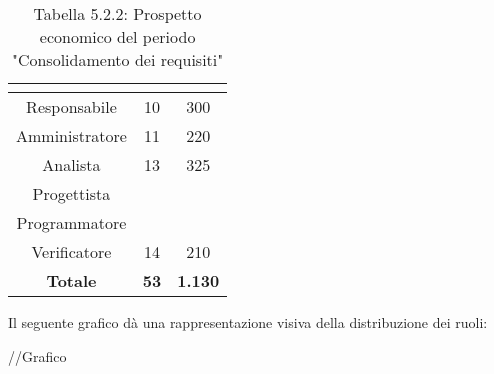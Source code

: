 \renewcommand{\arraystretch}{1.5}
\begin{table}[H]
\begin{center}
\begin{tabular}{|c|c|c|}
\hline
\rowcolor{title_row}
\textbf{\color{title_text}{Ruolo}}  & \textbf{\color{title_text}{Ore}} & \textbf{\color{title_text}{Costo in \euro}} \\ \hline
Responsabile    & 10 & 300 \\ \hline
Amministratore  & 11 & 220 \\ \hline
Analista        & 13 & 325 \\ \hline
Progettista     & & \\ \hline
Programmatore   & & \\ \hline
Verificatore    & 14 & 210 \\ \hline
\textbf{Totale} & \textbf{53}    & \textbf{1.130}    \\ \hline
\end{tabular}
\caption{Tabella 5.2.2: Prospetto economico del periodo "Consolidamento dei requisiti"\label{}}
\end{center}
\end{table}
\renewcommand{\arraystretch}{1}

Il seguente grafico dà una rappresentazione visiva della distribuzione dei ruoli: \\
\begin{center}
//Grafico
\end{center}

\pagebreak
